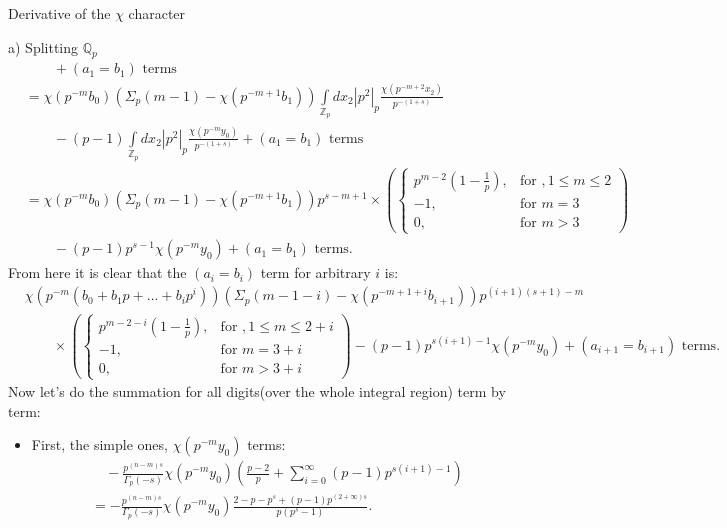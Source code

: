 \documentclass[12pt]{article}
\begin{document}
\begin{section}{Derivative of the $\chi$ character}
\begin{paragraph}{a) Splitting $\mathbb{Q}_p$}
\begin{equation}
\begin{aligned}
&\qquad+(a_1=b_1)\text{ terms}\\
&=\chi(p^{-m}b_0)(\Sigma_p(m-1)-\chi(p^{-m+1}b_1))\int\limits _{\mathbb{Z}_p}dx_2|p^2|_p \frac{\chi( p^{-m+2} x_2) }{p^{-(1+s)}}\\
&\qquad-(p-1)\int\limits_{\mathbb{Z}_p}dx_2|p^2|_p\frac{\chi( p^{-m}y_0)}{p^{-(1+s)}}+(a_1=b_1)\text{ terms}\\
&=\chi(p^{-m}b_0)(\Sigma_p(m-1)-\chi(p^{-m+1}b_1))p^{s-m+1}\times\left( 
  \begin{cases}
    p^{m-2}(1-\frac{1}{p}), & \text{for } ,1\leq m \leq 2 \\
    -1, & \text{for } m=3 \\
    0, & \text{for } m>3
  \end{cases}
   \right)\\
&\qquad-(p-1)p^{s-1}\chi(p^{-m}y_0)+(a_1=b_1)\text{ terms}.
\end{aligned}
\end{equation}
From here it is clear that the $(a_i=b_i)$ term for arbitrary $i$ is:
\begin{equation}
\begin{aligned}
&\chi(p^{-m}(b_0+b_1p+...+b_{i}p^{i}))(\Sigma_p(m-1-i)-\chi(p^{-m+1+i}b_{i+1}))p^{(i+1)(s+1)-m}\\
&\qquad\times\left( 
  \begin{cases}
    p^{m-2-i}(1-\frac{1}{p}), & \text{for } ,1\leq m \leq 2+i \\
    -1, & \text{for } m=3+i \\
    0, & \text{for } m>3+i
  \end{cases}
   \right) -(p-1)p^{s(i+1)-1}\chi(p^{-m}y_0)+(a_{i+1}=b_{i+1})\text{ terms}.
\end{aligned}
\end{equation} 
Now let's do the summation for all digits(over the whole integral region) term by term:
\begin{itemize}
\item First, the simple ones, $\chi(p^{-m}y_0)$ terms:
\begin{equation}
\begin{aligned}
&\quad-\frac{p^{(n-m)s}}{\Gamma_p(-s)}\chi(p^{-m}y_0)(\frac{p-2}{p}+\sum\limits_{i=0}^{\infty}(p-1)p^{s(i+1)-1})\\
&=-\frac{p^{(n-m)s}}{\Gamma_p(-s)}\chi(p^{-m}y_0)\frac{2-p-p^s+(p-1)p^{(2+\infty)s}}{p(p^s-1)}.
\end{aligned}
\end{equation}
\end{itemize}

\end{paragraph}
\end{section}
\end{document}
